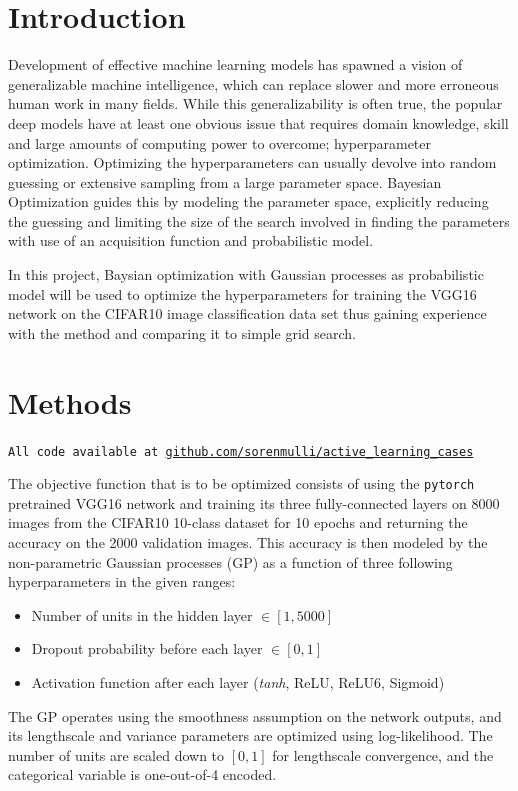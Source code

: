 \documentclass[12pt,fleqn]{article}
\begin{document}
\begin{multicols}{2}


\section{Introduction} 
Development of effective machine learning models has spawned a vision of generalizable machine intelligence, which can replace slower and more erroneous human work in many fields. While this generalizability is often true, the popular deep models have at least one obvious issue that requires domain knowledge, skill and large amounts of computing power to overcome; hyperparameter optimization. Optimizing the hyperparameters can usually devolve into random guessing or extensive sampling from a large parameter space. Bayesian Optimization guides this by modeling the parameter space, explicitly reducing the guessing and limiting the size of the search involved in finding the parameters with use of an acquisition function and probabilistic model.

In this project, Baysian optimization with Gaussian processes as probabilistic model will be used to optimize the hyperparameters for training the VGG16 network on the CIFAR10 image classification data set thus gaining experience with the method and comparing it to simple grid search.
\vspace*{-0.3cm}
\section{Methods}
\vspace*{-0.2cm}
\texttt{All code available at \url{github.com/sorenmulli/active_learning_cases}}

The objective function that is to be optimized consists of using the \texttt{pytorch} pretrained VGG16 network \cite{vgg} and training its three fully-connected layers on 8000 images from the CIFAR10 10-class dataset \cite{cifar10} for 10 epochs and returning the accuracy on the 2000 validation images. 
This accuracy is then modeled by the non-parametric Gaussian processes (GP) as a function of three following hyperparameters in the given ranges:
\vspace*{-0.05cm}
\begin{itemize}
	\item Number of units in the hidden layer \(\in [1, 5000]\) 
	\item Dropout probability before each layer \(\in [0,1]\)
	\item Activation function after each layer (\textit{tanh}, ReLU, ReLU6, Sigmoid)
\end{itemize}
The GP operates using the smoothness assumption on the network outputs, and its lengthscale and variance parameters are optimized using log-likelihood. The number of units are scaled down to \([0,1]\) for lengthscale convergence, and the categorical variable is one-out-of-4 encoded. 


\end{multicols}
\end{document}
